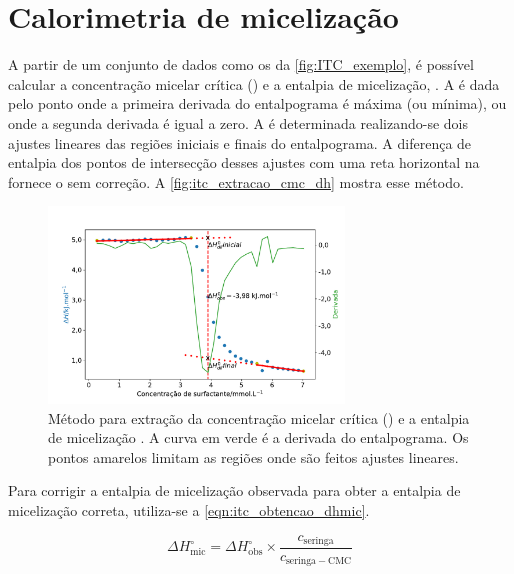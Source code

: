 		\FloatBarrier
		
		\section{Calorimetria de micelização} 
		\label{sec:calorimetria_micelizacao}
		A partir de um conjunto de dados como os da \autoref{fig:ITC_exemplo}, é possível calcular a concentração micelar crítica (\cmc) e a entalpia de micelização, \DHmic. A \cmc{} é dada pelo ponto onde a primeira derivada do entalpograma é máxima (ou mínima)\cite{Bouchemal2010a}, ou onde a segunda derivada é igual a zero.\cite{Sarac2009}  A \DHmic{} é determinada realizando-se dois ajustes lineares das regiões iniciais e finais do entalpograma.\cite{Loh2016} A diferença de entalpia dos pontos de intersecção desses ajustes com uma reta horizontal na \cmc{} fornece o \DHmic{} sem correção.  A \autoref{fig:itc_extracao_cmc_dh} mostra esse método.
		
		\begin{figure}[h] 
			\centering
			\includegraphics[width=0.7\textwidth]{imagens/itc/extracao_cmc_dh_exemplo}
			\caption{Método para extração da concentração micelar crítica (\cmc) e a entalpia de micelização \DHmic. A curva em verde é a derivada do entalpograma. Os pontos amarelos limitam as regiões onde são feitos ajustes lineares.}
			\label{fig:itc_extracao_cmc_dh}
		\end{figure} 

		Para corrigir a entalpia de micelização observada para obter a entalpia de micelização correta, utiliza-se a \autoref{eqn:itc_obtencao_dhmic}.\cite{Loh2016}  
		
		\begin{equation}
			\Delta H^\circ_{\textrm{mic}} = \Delta H^\circ_{\textrm{obs}} \times \dfrac{c_{\textrm{seringa}}}{c_{\textrm{seringa}-\mathrm{CMC}}}
			\label{eqn:itc_obtencao_dhmic}
		\end{equation}  %
		
